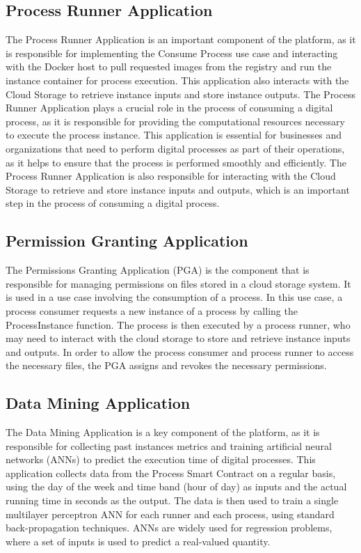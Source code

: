 \documentclass[10pt,a4paper]{report}
\begin{document}
\subsection{Process Runner Application}
\large\justify The Process Runner Application is an important component of the platform, as it is responsible for implementing the Consume Process use case and interacting with the Docker host to pull requested images from the registry and run the instance container for process execution. This application also interacts with the Cloud Storage to retrieve instance inputs and store instance outputs. The Process Runner Application plays a crucial role in the process of consuming a digital process, as it is responsible for providing the computational resources necessary to execute the process instance. This application is essential for businesses and organizations that need to perform digital processes as part of their operations, as it helps to ensure that the process is performed smoothly and efficiently. The Process Runner Application is also responsible for interacting with the Cloud Storage to retrieve and store instance inputs and outputs, which is an important step in the process of consuming a digital process.

\subsection{Permission Granting Application}
\large\justify The Permissions Granting Application (PGA) is the component that is responsible for managing permissions on files stored in a cloud storage system. It is used in a use case involving the consumption of a process. In this use case, a process consumer requests a new instance of a process by calling the ProcessInstance function. The process is then executed by a process runner, who may need to interact with the cloud storage to store and retrieve instance inputs and outputs. In order to allow the process consumer and process runner to access the necessary files, the PGA assigns and revokes the necessary permissions.

\subsection{Data Mining Application}
\large\justify The Data Mining Application is a key component of the platform, as it is responsible for collecting past instances metrics and training artificial neural networks (ANNs) to predict the execution time of digital processes. This application collects data from the Process Smart Contract on a regular basis, using the day of the week and time band (hour of day) as inputs and the actual running time in seconds as the output. The data is then used to train a single multilayer perceptron ANN for each runner and each process, using standard back-propagation techniques. ANNs are widely used for regression problems, where a set of inputs is used to predict a real-valued quantity.
\end{document}
